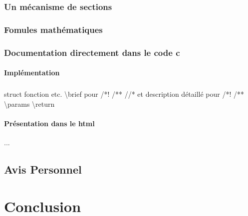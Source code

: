 \documentclass{report}
\begin{document}
\section{Un mécanisme de sections}
\section{Fomules mathématiques}
\section{Documentation directement dans le code c}
\subsection{Implémentation}
\subsubsection{} struct fonction etc.
\textbackslash brief pour /*! /** //* et description détaillé pour /*! /**
\textbackslash params
\textbackslash  return
\subsection{Présentation dans le html} ...
\chapter{Avis Personnel}
\part{Conclusion}
\end{document}

